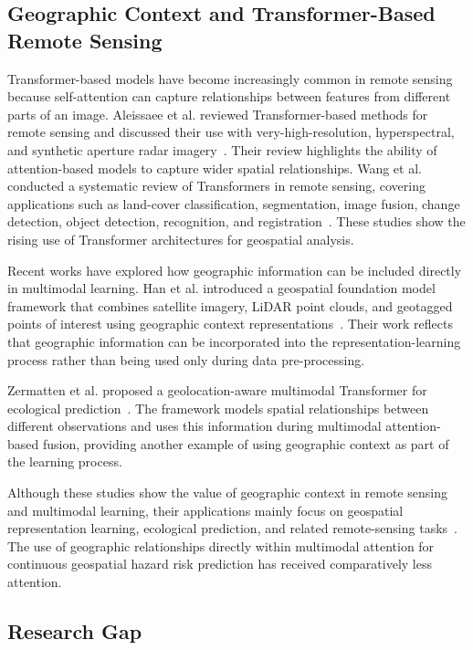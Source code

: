 \documentclass[sigconf, review=true]{acmart}
\begin{document}
\subsection{Geographic Context and Transformer-Based Remote Sensing}

Transformer-based models have become increasingly common in remote sensing because self-attention can capture relationships between features from different parts of an image. Aleissaee et al. reviewed Transformer-based methods for remote sensing and discussed their use with very-high-resolution, hyperspectral, and synthetic aperture radar imagery~\cite{aleissaee2023transformers}. Their review highlights the ability of attention-based models to capture wider spatial relationships. Wang et al. conducted a systematic review of Transformers in remote sensing, covering applications such as land-cover classification, segmentation, image fusion, change detection, object detection, recognition, and registration~\cite{wang2024transformers}. These studies show the rising use of Transformer architectures for geospatial analysis.

Recent works have explored how geographic information can be included directly in multimodal learning. Han et al. introduced a geospatial foundation model framework that combines satellite imagery, LiDAR point clouds, and geotagged points of interest using geographic context representations~\cite{han2025geofoundation}. Their work reflects that geographic information can be incorporated into the representation-learning process rather than being used only during data pre-processing.

Zermatten et al. proposed a geolocation-aware multimodal Transformer for ecological prediction~\cite{zermatten2026gamma}. The framework models spatial relationships between different observations and uses this information during multimodal attention-based fusion, providing another example of using geographic context as part of the learning process.

Although these studies show the value of geographic context in remote sensing and multimodal learning, their applications mainly focus on geospatial representation learning, ecological prediction, and related remote-sensing tasks~\cite{aleissaee2023transformers,wang2024transformers,han2025geofoundation,zermatten2026gamma}. The use of geographic relationships directly within multimodal attention for continuous geospatial hazard risk prediction has received comparatively less attention.

\subsection{Research Gap}
\end{document}
